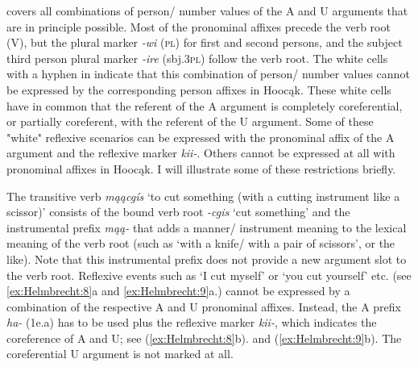 \documentclass[output=paper]{langscibook}
\begin{document}
 covers all combinations of person/ number values of the A and U arguments that are in principle possible. Most of the pronominal affixes precede the verb root (V), but the plural marker \textit{{}-wi} (\textsc{pl}) for first and second persons, and the subject third person plural marker \textit{{}-ire} (sbj.3\textsc{pl}) follow the verb root. The white cells with a hyphen in  indicate that this combination of person/ number values cannot be expressed by the corresponding person affixes in Hoocąk. These white cells have in common that the referent of the A argument is completely coreferential, or partially coreferent, with the referent of the U argument. Some of these "white" reflexive scenarios can be expressed with the pronominal affix of the A argument and the reflexive marker \textit{kii-}. Others cannot be expressed at all with pronominal affixes in Hoocąk. I will illustrate some of these restrictions briefly.

 The transitive verb \textit{mąącgís} `to cut something (with a cutting instrument like a scissor)' consists of the bound verb root \textit{{}-cgis} `cut something' and the instrumental prefix \textit{mąą-} that adds a manner/ instrument meaning to the lexical meaning of the verb root (such as `with a knife/ with a pair of scissors’, or the like). Note that this instrumental prefix does not provide a new argument slot to the verb root. Reflexive events such as `I cut myself' or `you cut yourself' etc. (see \ref{ex:Helmbrecht:8}a and \ref{ex:Helmbrecht:9}a.) cannot be expressed by a combination of the respective A and U pronominal affixes. Instead, the A prefix \textit{ha-} (1e.a) has to be used plus the reflexive marker \textit{kii-}, which indicates the coreference of A and U; see (\ref{ex:Helmbrecht:8}b). and (\ref{ex:Helmbrecht:9}b). The coreferential U argument is not marked at all.


\ea \label{ex:Helmbrecht:8} 
	\z 
\z   
 
\end{document}
